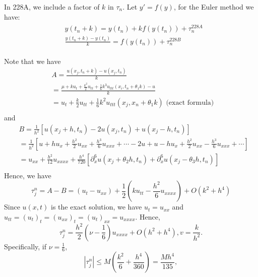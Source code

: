 \begin{note}
In 228A, we include a factor of $k$ in $\tau_n$. Let $ y' = f(y) $, for the Euler method we have: 
\begin{align*}
    \begin{aligned}
        & y\left(t_n+k\right)=y\left(t_n\right)+k f\left(y\left(t_n\right)\right)+\tau_n^{22 8 A} \\
        & \frac{y\left(t_n+k\right)-y\left(t_n\right)}{k}=f\left(y\left(t_n\right)\right)+\tau_n^{228 B}
        \end{aligned}
\end{align*} 
\end{note}
Note that we have 
\[
    \begin{aligned}
        & A=\frac{u\left(x_j, t_n+k\right)-u\left(x_j, t_n\right)}{k}  \\
        & =\frac{\mu+k u_t+\frac{k^2}{2} u_{tt}+\frac{1}{6} k^3 u_{ttt}\left(x_i, t_n+\theta_1 k\right)-u}{k} \\
        & =u_t+\frac{k}{2} u_{tt}+\frac{1}{6} k^2 u_{ttt}\left(x_j, x_n+\theta_1 k\right) \text { (exact formula) } \\
        &
        \end{aligned}
\]
and 
\[
    \begin{aligned}
        & B=\frac{1}{h^2}\left[u\left(x_j+h, t_n\right)-2 u\left(x_j, t_n\right)+u\left(x_j-h, t_n\right)\right] \\
        & =\frac{1}{h^2}\left[   u+h u_x+\frac{h^2}{2} u_{x x}+\frac{h^3}{6} u_{x x x}+\cdots 
        -2 u +u - h u_x+\frac{h^2}{2} u_{x x}-\frac{h^3}{6} u_{x x x}+\cdots \right] \\
        & =u_{x x}+\frac{h^2}{12} u_{x x x x}+\frac{h^4}{720} \left[         \partial_x^6 u\left(x_j+\theta_2 h, t_n\right) 
        +\partial_x^6 u\left(x_j-\theta_3 h, t_n\right) \right]  \\
        \end{aligned}
\]
Hence, we have 
\[
    \tau_j^n=A-B=\left(u_t-u_{x x}\right)+\frac{1}{2}\left(k u_{t t}-\frac{h^2}{6} u_{x x x x}\right)+O\left(k^2+h^4\right)
\]
Since $u(x,t)$ is the exact solution, we have $ u_t = u_{ xx }  $  and $u_{tt} = (u_t)_t = (u_{ xx } )_t = (u_t)_{ xx } =u_{xxxx}$. Hence, 
\[
    \tau_j^n=\frac{h^2}{2}\left( \nu -\frac{1}{6}\right) u_{xxxx} +O\left(h^2+h^4\right), v=\frac{k}{h^2}. 
\]
Specifically, if $ \nu =\frac{1}{6}$, 
\[
    \left|\tau_j^n\right| \leqslant M\left(\frac{k^2}{6}+\frac{h^4}{360}\right)=\frac{M h^4}{135},
\]
